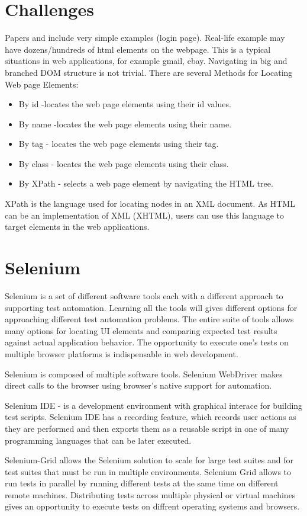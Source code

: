 	\section {Challenges}
		Papers \cite{Xu1} \cite{Zhongen2} and \cite{testGen3} include very simple examples
		(login page). Real-life example may have dozens/hundreds of html elements on the webpage. This is a typical
		situations in web applications, for example gmail, ebay. Navigating in big and
		branched DOM structure is not trivial. 
		There are several Methods for Locating Web page Elements:
		\begin{itemize}
		  \item By id -locates the web page elements using their id values.
		  \item By name -locates the web page elements using their name.
		  \item By tag - locates the web page elements using their tag.
		  \item By class - locates the web page elements using their class.
		  \item By XPath - selects a web page element by navigating the HTML tree.
		\end{itemize}

		XPath is the language used for locating nodes in an XML document. As HTML can
		be an implementation of XML (XHTML), users can use this language to target
		elements in the web applications.	

	\section {Selenium}
      Selenium is a set of different software tools each with a different approach
       to supporting test automation. Learning all the tools will gives different options for approaching different 
       test automation problems. The entire suite of tools allows many options for locating UI
       elements and comparing expected test results against actual application behavior.
       The opportunity to execute one's tests on multiple browser platforms is
       indispensable in web development. 
       
       Selenium is composed of multiple software tools.
       Selenium  WebDriver makes direct calls to the browser using browser's
       native support for automation.
       
       Selenium IDE - is a development environment with graphical interace for
       building test scripts.
       Selenium IDE has a recording feature, which records user actions as they are performed and
       then exports them as a reusable script in one of many programming languages that can be later executed.
       
       Selenium-Grid allows the Selenium solution to scale for large test
       suites and for test suites that must be run in multiple environments. 
       Selenium Grid allows to run tests in parallel by running different tests
       at the same time on different remote machines. Distributing tests across
       multiple physical or virtual machines gives an opportunity to execute
       tests on diffrent operating systems and browsers. 